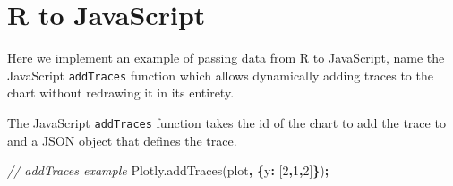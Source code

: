 \documentclass[
]{krantz}
\makeatletter
\newenvironment{Shaded}{\begin{snugshade}}{\end{snugshade}}
\newcommand{\AttributeTok}[1]{\textcolor[rgb]{0.61,0.61,0.61}{#1}}
\newcommand{\CommentTok}[1]{\textcolor[rgb]{0.37,0.37,0.37}{\textit{#1}}}
\newcommand{\ControlFlowTok}[1]{\textcolor[rgb]{0.27,0.27,0.27}{\textbf{#1}}}
\newcommand{\DataTypeTok}[1]{\textcolor[rgb]{0.27,0.27,0.27}{#1}}
\newcommand{\DecValTok}[1]{\textcolor[rgb]{0.06,0.06,0.06}{#1}}
\newcommand{\KeywordTok}[1]{\textcolor[rgb]{0.27,0.27,0.27}{\textbf{#1}}}
\newcommand{\NormalTok}[1]{#1}
\newcommand{\OperatorTok}[1]{\textcolor[rgb]{0.43,0.43,0.43}{\textbf{#1}}}
\newcommand{\StringTok}[1]{\textcolor[rgb]{0.5,0.5,0.5}{#1}}
\newcommand{\VariableTok}[1]{\textcolor[rgb]{0,0,0}{#1}}
\newenvironment{kframe}{%
\medskip{}
\setlength{\fboxsep}{.8em}
 \def\at@end@of@kframe{}%
 \ifinner\ifhmode%
  \def\at@end@of@kframe{\end{minipage}}%
  \begin{minipage}{\columnwidth}%
 \fi\fi%
 \def\FrameCommand##1{\hskip\@totalleftmargin \hskip-\fboxsep
 \colorbox{shadecolor}{##1}\hskip-\fboxsep
     \hskip-\linewidth \hskip-\@totalleftmargin \hskip\columnwidth}%
 \MakeFramed {\advance\hsize-\width
   \@totalleftmargin\z@ \linewidth\hsize
   \@setminipage}}%
 {\par\unskip\endMakeFramed%
 \at@end@of@kframe}
\renewenvironment{Shaded}{\begin{kframe}}{\end{kframe}}
\makeatother
\begin{document}
\begin{Shaded}
\end{Shaded}

\hypertarget{r-to-javascript}{%
\section{R to JavaScript}\label{r-to-javascript}}

Here we implement an example of passing data from R to JavaScript, name the JavaScript \texttt{addTraces} function which allows dynamically adding traces to the chart without redrawing it in its entirety.

The JavaScript \texttt{addTraces} function takes the id of the chart to add the trace to and a JSON object that defines the trace.

\begin{Shaded}
\begin{Highlighting}[]
\CommentTok{// addTraces example}
\VariableTok{Plotly}\NormalTok{.}\AttributeTok{addTraces}\NormalTok{(}\StringTok{\textquotesingle{}plot\textquotesingle{}}\OperatorTok{,} \OperatorTok{\{}\DataTypeTok{y}\OperatorTok{:}\NormalTok{ [}\DecValTok{2}\OperatorTok{,}\DecValTok{1}\OperatorTok{,}\DecValTok{2}\NormalTok{]}\OperatorTok{\}}\NormalTok{)}\OperatorTok{;}
\end{Highlighting}
\end{Shaded}
\end{document}
